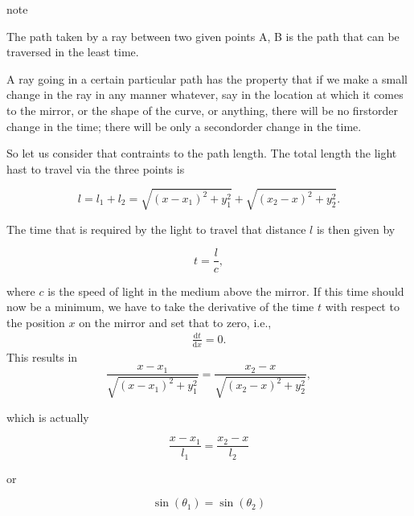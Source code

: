 \documentclass[letterpaper,10pt,english]{sphinxmanual}
\begin{document}
\begin{sphinxadmonition}{note}{}\unskip
{}

The path taken by a ray between two given points A, B is the path that can be traversed in the least time.

 A ray going in a certain particular path has the property that if we make a small change in the ray in any manner whatever, say in the location at which it comes to the mirror, or the shape of the curve, or anything, there will be no first\sphinxhyphen{}order change in the time; there will be only a second\sphinxhyphen{}order change in the time.
\end{sphinxadmonition}

So let us consider that contraints to the path length. The total length the light hast to travel via the three points is

\begin{equation}
l=l_{1}+l_{2}=\sqrt{(x-x_1)^2+y_1^2}+\sqrt{(x_2-x)^2+y_2^2}.
\end{equation}

The time that is required by the light to travel that distance \(l\) is then given by

\begin{equation}
t=\frac{l}{c},
\end{equation}

where \(c\) is the speed of light in the medium above the mirror. If this time should now be a minimum, we have to take the derivative of the time \(t\) with respect to the position \(x\) on the mirror and set that to zero, i.e.,
\begin{equation*}
\begin{split}\frac{\mathrm dt}{\mathrm dx}=0.\end{split}
\end{equation*}
This results in \begin{equation}
\frac{x-x_1}{\sqrt{(x-x_1)^2+y_{1}^2}}=\frac{x_2-x}{\sqrt{(x_2-x)^2+y_{2}^2}},
\end{equation}

which is actually

\begin{equation}
\frac{x-x_1}{l_1}=\frac{x_2-x}{l_2}
\end{equation}

or

\begin{equation}
\sin(\theta_1)=\sin(\theta_2)
\end{equation}
\end{document}
